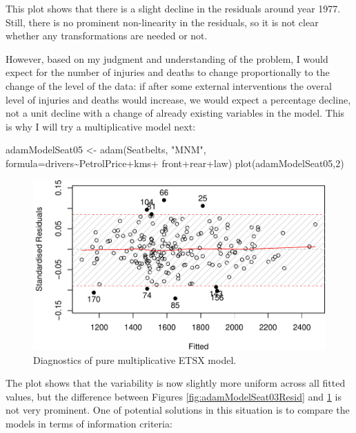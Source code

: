 \documentclass[
]{book}
\newenvironment{Shaded}{\begin{snugshade}}{\end{snugshade}}
\newcommand{\AttributeTok}[1]{\textcolor[rgb]{0.77,0.63,0.00}{#1}}
\newcommand{\DecValTok}[1]{\textcolor[rgb]{0.00,0.00,0.81}{#1}}
\newcommand{\FunctionTok}[1]{\textcolor[rgb]{0.00,0.00,0.00}{#1}}
\newcommand{\NormalTok}[1]{#1}
\newcommand{\OtherTok}[1]{\textcolor[rgb]{0.56,0.35,0.01}{#1}}
\newcommand{\SpecialCharTok}[1]{\textcolor[rgb]{0.00,0.00,0.00}{#1}}
\newcommand{\StringTok}[1]{\textcolor[rgb]{0.31,0.60,0.02}{#1}}
\theoremstyle{definition}
\theoremstyle{definition}
\theoremstyle{definition}
\theoremstyle{definition}
\theoremstyle{remark}
\begin{document}
This plot shows that there is a slight decline in the residuals around year 1977. Still, there is no prominent non-linearity in the residuals, so it is not clear whether any transformations are needed or not.

However, based on my judgment and understanding of the problem, I would expect for the number of injuries and deaths to change proportionally to the change of the level of the data: if after some external interventions the overal level of injuries and deaths would increase, we would expect a percentage decline, not a unit decline with a change of already existing variables in the model. This is why I will try a multiplicative model next:

\begin{Shaded}
\begin{Highlighting}[]
\NormalTok{adamModelSeat05 }\OtherTok{\textless{}{-}} \FunctionTok{adam}\NormalTok{(Seatbelts, }\StringTok{"MNM"}\NormalTok{,}
                        \AttributeTok{formula=}\NormalTok{drivers}\SpecialCharTok{\textasciitilde{}}\NormalTok{PetrolPrice}\SpecialCharTok{+}\NormalTok{kms}\SpecialCharTok{+}
\NormalTok{                          front}\SpecialCharTok{+}\NormalTok{rear}\SpecialCharTok{+}\NormalTok{law)}
\FunctionTok{plot}\NormalTok{(adamModelSeat05,}\DecValTok{2}\NormalTok{)}
\end{Highlighting}
\end{Shaded}

\begin{figure}
\centering
\includegraphics{adam_files/figure-latex/adamModelSeat05Resid-1.pdf}
\caption{\label{fig:adamModelSeat05Resid}Diagnostics of pure multiplicative ETSX model.}
\end{figure}

The plot shows that the variability is now slightly more uniform across all fitted values, but the difference between Figures \ref{fig:adamModelSeat03Resid} and \ref{fig:adamModelSeat05Resid} is not very prominent. One of potential solutions in this situation is to compare the models in terms of information criteria:
\end{document}
